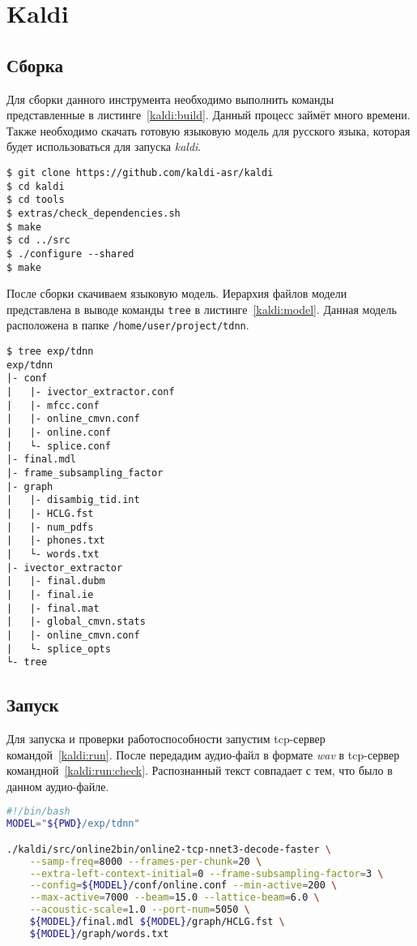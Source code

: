 \section{Kaldi}
\subsection{Сборка}
Для сборки данного инструмента необходимо выполнить команды
представленные в листинге~\ref{kaldi:build}. Данный процесс займёт много времени.
Также необходимо скачать готовую языковую модель для русского языка, которая
будет использоваться для запуска \textit{kaldi}.

\begin{lstlisting}[caption={Сборка Kaldi}, label=kaldi:build]
$ git clone https://github.com/kaldi-asr/kaldi
$ cd kaldi
$ cd tools
$ extras/check_dependencies.sh
$ make
$ cd ../src
$ ./configure --shared
$ make
\end{lstlisting}

После сборки скачиваем языковую модель. Иерархия файлов модели представлена
в выводе команды \texttt{tree} в листинге~\ref{kaldi:model}. Данная модель
расположена в папке \texttt{/home/user/project/tdnn}.

\begin{lstlisting}[caption={Структура языковой модели}, label={kaldi:model}]
$ tree exp/tdnn
exp/tdnn
|- conf
|   |- ivector_extractor.conf
|   |- mfcc.conf
|   |- online_cmvn.conf
|   |- online.conf
|   └- splice.conf
|- final.mdl
|- frame_subsampling_factor
|- graph
|   |- disambig_tid.int
|   |- HCLG.fst
|   |- num_pdfs
|   |- phones.txt
|   └- words.txt
|- ivector_extractor
|   |- final.dubm
|   |- final.ie
|   |- final.mat
|   |- global_cmvn.stats
|   |- online_cmvn.conf
|   └- splice_opts
└- tree
\end{lstlisting}

\subsection{Запуск}
Для запуска и проверки работоспособности запустим tcp-сервер командой~\ref{kaldi:run}.
После передадим аудио-файл в формате \textit{wav} в tcp-сервер командной~\ref{kaldi:run:check}.
\linebreak Распознанный текст совпадает с тем, что было в данном аудио-файле.

\begin{lstlisting}[caption={Запуск tcp-сервера},label={kaldi:run},language=bash]
#!/bin/bash
MODEL="${PWD}/exp/tdnn"

./kaldi/src/online2bin/online2-tcp-nnet3-decode-faster \
    --samp-freq=8000 --frames-per-chunk=20 \
    --extra-left-context-initial=0 --frame-subsampling-factor=3 \
    --config=${MODEL}/conf/online.conf --min-active=200 \
    --max-active=7000 --beam=15.0 --lattice-beam=6.0 \
    --acoustic-scale=1.0 --port-num=5050 \
    ${MODEL}/final.mdl ${MODEL}/graph/HCLG.fst \
    ${MODEL}/graph/words.txt
\end{lstlisting}


